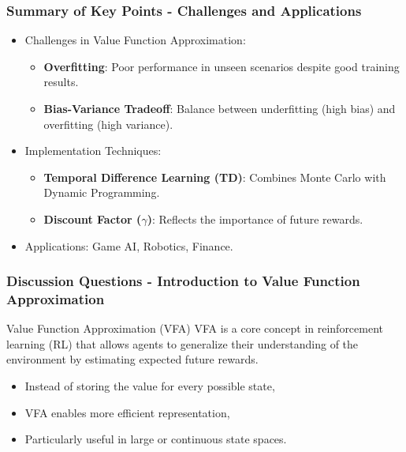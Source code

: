 \documentclass[aspectratio=169]{beamer}
\begin{document}
\begin{frame}[fragile]
    \frametitle{Summary of Key Points - Challenges and Applications}
    \begin{itemize}
        \item Challenges in Value Function Approximation:
        \begin{itemize}
            \item \textbf{Overfitting}: Poor performance in unseen scenarios despite good training results.
            \item \textbf{Bias-Variance Tradeoff}: Balance between underfitting (high bias) and overfitting (high variance).
        \end{itemize}
        \item Implementation Techniques:
        \begin{itemize}
            \item \textbf{Temporal Difference Learning (TD)}: Combines Monte Carlo with Dynamic Programming.
            \item \textbf{Discount Factor (\( \gamma \))}: Reflects the importance of future rewards.
        \end{itemize}
        \item Applications: Game AI, Robotics, Finance.
    \end{itemize}
\end{frame}

\begin{frame}[fragile]
    \frametitle{Discussion Questions - Introduction to Value Function Approximation}
    \begin{block}{Value Function Approximation (VFA)}
        VFA is a core concept in reinforcement learning (RL) that allows agents to generalize their understanding of the environment by estimating expected future rewards. 
        \begin{itemize}
            \item Instead of storing the value for every possible state,
            \item VFA enables more efficient representation,
            \item Particularly useful in large or continuous state spaces.
        \end{itemize}
    \end{block}
\end{frame}
\end{document}
